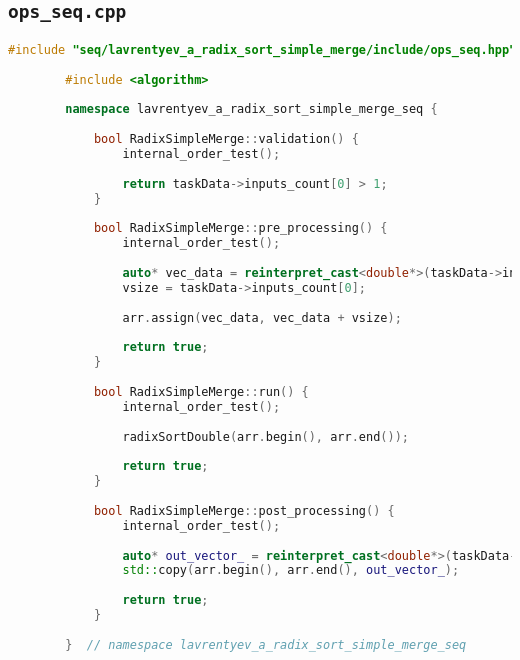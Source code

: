 \documentclass[12pt]{article}
\begin{document}
	\subsection*{\texttt{ops\_seq.cpp}}
	
	\begin{lstlisting}[language=C++]
		#include "seq/lavrentyev_a_radix_sort_simple_merge/include/ops_seq.hpp"
		
		#include <algorithm>
		
		namespace lavrentyev_a_radix_sort_simple_merge_seq {
			
			bool RadixSimpleMerge::validation() {
				internal_order_test();
				
				return taskData->inputs_count[0] > 1;
			}
			
			bool RadixSimpleMerge::pre_processing() {
				internal_order_test();
				
				auto* vec_data = reinterpret_cast<double*>(taskData->inputs[0]);
				vsize = taskData->inputs_count[0];
				
				arr.assign(vec_data, vec_data + vsize);
				
				return true;
			}
			
			bool RadixSimpleMerge::run() {
				internal_order_test();
				
				radixSortDouble(arr.begin(), arr.end());
				
				return true;
			}
			
			bool RadixSimpleMerge::post_processing() {
				internal_order_test();
				
				auto* out_vector_ = reinterpret_cast<double*>(taskData->outputs[0]);
				std::copy(arr.begin(), arr.end(), out_vector_);
				
				return true;
			}
			
		}  // namespace lavrentyev_a_radix_sort_simple_merge_seq
	\end{lstlisting}
	
\end{document}
